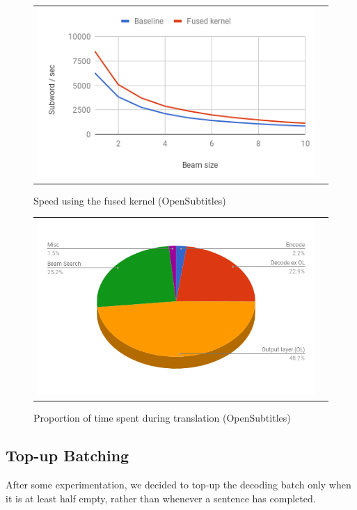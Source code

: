 \documentclass[11pt,a4paper]{article}
\begin{document}
\begin{figure}
\centering
\begin{tabular}{cc}
{\includegraphics[scale=0.5]{beam-opensubtitles.png}} 
\end{tabular}
\caption{Speed using the fused kernel (OpenSubtitles)}
\label{fig:beam-opensubtitles}
\end{figure} 

\begin{figure}
\centering
\begin{tabular}{cc}
{\includegraphics[scale=0.3]{pie-time-opensubtitles.png}} 
\end{tabular}
\caption{Proportion of time spent during translation (OpenSubtitles)}
\label{fig:pie-time-opensubtitles}
\end{figure} 

\subsection{Top-up Batching}

After some experimentation, we decided to top-up the decoding batch only when it is at least half empty, rather than whenever a sentence has completed.
\end{document}
